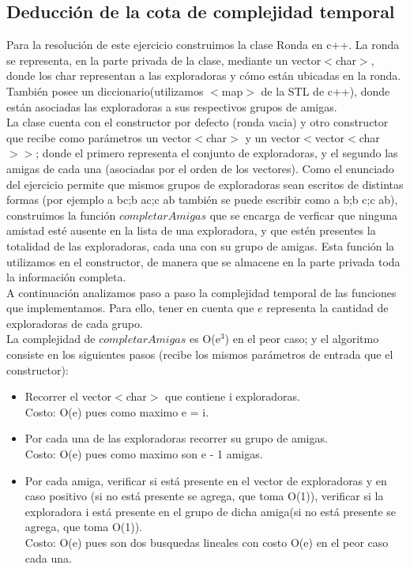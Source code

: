 \subsection{Deducción de la cota de complejidad temporal}

Para la resolución de este ejercicio construimos la clase Ronda en c++. La ronda se representa, en la parte privada de la clase,
mediante un vector$<$char$>$, donde los char representan a las exploradoras y cómo están ubicadas en la ronda. También posee un 
diccionario(utilizamos $<$map$>$ de la STL de c++), donde están asociadas las exploradoras a sus respectivos grupos de amigas. \\
La clase cuenta con el constructor por defecto (ronda vacia) y otro constructor que recibe como parámetros un vector$<$char$>$ y un
vector$<$vector$<$char$>>$; donde el primero representa el conjunto de exploradoras, y el segundo las amigas de cada una (asociadas
por el orden de los vectores). Como el enunciado del ejercicio permite que mismos grupos de exploradoras sean escritos de distintas 
formas (por ejemplo a bc;b ac;c ab también se puede escribir como a b;b c;c ab), construimos la función $completarAmigas$ que se 
encarga de verficar que ninguna amistad esté ausente en la lista de una exploradora, y que estén presentes la totalidad de las 
exploradoras, cada una con su grupo de amigas. Esta función la utilizamos en el constructor, de manera que se almacene en la parte 
privada toda la información completa. \\
A continuación analizamos paso a paso la complejidad temporal de las funciones que implementamos. Para ello, tener en cuenta que 
$e$ representa la cantidad de exploradoras de cada grupo. \\
La complejidad de $completarAmigas$ es O(e$^3$) en el peor caso; y el algoritmo consiste en los siguientes pasos (recibe los mismos parámetros de entrada que el constructor): \\
\begin{itemize}
\item Recorrer el vector$<$char$>$ que contiene i exploradoras. \\
Costo: O(e) pues como maximo  e = i. 
\item Por cada una de las exploradoras recorrer su grupo de amigas. \\
Costo: O(e) pues como maximo son e - 1 amigas.
\item Por cada amiga, verificar si está presente en el vector de exploradoras y en caso positivo (si no está presente se agrega, que 
toma O(1)), verificar si la exploradora i está presente en el grupo de dicha amiga(si no está presente se agrega, que 
toma O(1)).  \\
Costo: O(e) pues son dos busquedas lineales con costo O(e) en el peor caso cada una.
\end{itemize}
